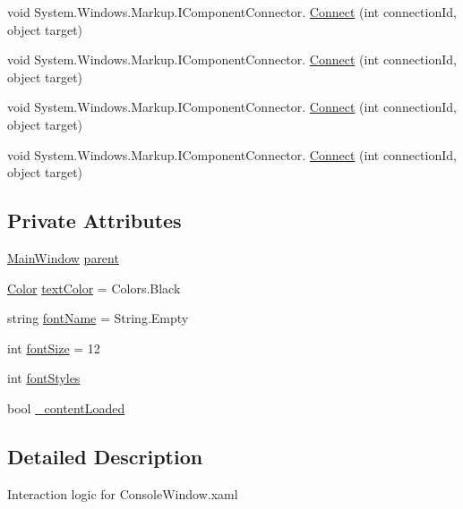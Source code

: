 \begin{DoxyCompactItemize}
\item 
void System.\+Windows.\+Markup.\+I\+Component\+Connector. \hyperlink{class_c_p_u___o_s___simulator_1_1_console_window_a8fc3e3f38ff00f6239dca33ff68de0d2}{Connect} (int connection\+Id, object target)
\item 
void System.\+Windows.\+Markup.\+I\+Component\+Connector. \hyperlink{class_c_p_u___o_s___simulator_1_1_console_window_a8fc3e3f38ff00f6239dca33ff68de0d2}{Connect} (int connection\+Id, object target)
\item 
void System.\+Windows.\+Markup.\+I\+Component\+Connector. \hyperlink{class_c_p_u___o_s___simulator_1_1_console_window_a8fc3e3f38ff00f6239dca33ff68de0d2}{Connect} (int connection\+Id, object target)
\item 
void System.\+Windows.\+Markup.\+I\+Component\+Connector. \hyperlink{class_c_p_u___o_s___simulator_1_1_console_window_a8fc3e3f38ff00f6239dca33ff68de0d2}{Connect} (int connection\+Id, object target)
\end{DoxyCompactItemize}
\subsection*{Private Attributes}
\begin{DoxyCompactItemize}
\item 
\hyperlink{class_c_p_u___o_s___simulator_1_1_main_window}{Main\+Window} \hyperlink{class_c_p_u___o_s___simulator_1_1_console_window_a1e38326bb40f4ed44c4964d94dc6f809}{parent}
\item 
\hyperlink{_console_window_8xaml_8cs_adf2800823d988ace598d734fdec29975}{Color} \hyperlink{class_c_p_u___o_s___simulator_1_1_console_window_a155c42bee25bd537a2656828bdf6f527}{text\+Color} = Colors.\+Black
\item 
string \hyperlink{class_c_p_u___o_s___simulator_1_1_console_window_a78375ad950278e847c76e7de38aa1e31}{font\+Name} = String.\+Empty
\item 
int \hyperlink{class_c_p_u___o_s___simulator_1_1_console_window_a0c319b98b649d11ffa185590e771cbb1}{font\+Size} = 12
\item 
int \hyperlink{class_c_p_u___o_s___simulator_1_1_console_window_abe8a7e3f2f861cd266a24426b2ffbc1c}{font\+Styles}
\item 
bool \hyperlink{class_c_p_u___o_s___simulator_1_1_console_window_a4836f04e93faa3749609d7eba72e1712}{\+\_\+content\+Loaded}
\end{DoxyCompactItemize}


\subsection{Detailed Description}
Interaction logic for Console\+Window.\+xaml 

